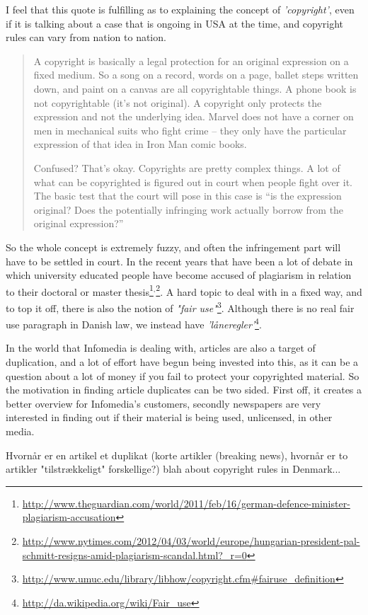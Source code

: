 I feel that this quote is fulfilling as to explaining the concept of \textit{'copyright'}, even if it is talking about a case that is ongoing in USA at the time, and copyright rules can vary from nation to nation.
\begin{quote}
A copyright is basically a legal protection for an original expression on a fixed medium. So a song on a record, words on a page, ballet steps written down, and paint on a canvas are all copyrightable things. A phone book is not copyrightable (it’s not original). A copyright only protects the expression and not the underlying idea. Marvel does not have a corner on men in mechanical suits who fight crime – they only have the particular expression of that idea in Iron Man comic books.

Confused? That's okay. Copyrights are pretty complex things. A lot of what can be copyrighted is figured out in court when people fight over it. The basic test that the court will pose in this case is “is the expression original? Does the potentially infringing work actually borrow from the original expression?” ~\cite{Copyright}
\end{quote}

So the whole concept is extremely fuzzy, and often the infringement part will have to be settled in court. In the recent years that have been a lot of debate in which university educated people have become accused of plagiarism  in relation to their doctoral or master thesis\footnote{\url{http://www.theguardian.com/world/2011/feb/16/german-defence-minister-plagiarism-accusation}}$^{,}$\footnote{\url{http://www.nytimes.com/2012/04/03/world/europe/hungarian-president-pal-schmitt-resigns-amid-plagiarism-scandal.html?_r=0}}. A hard topic to deal with in a fixed way, and to top it off, there is also the notion of \textit{"fair use"}\footnote{\url{http://www.umuc.edu/library/libhow/copyright.cfm\#fairuse_definition}}. Although there is no real fair use paragraph in Danish law, we instead have \textit{'låneregler'}\footnote{\url{http://da.wikipedia.org/wiki/Fair_use}}. 

In the world that Infomedia is dealing with, articles are also a target of duplication, and a lot of effort have begun being invested into this, as it can be a question about a lot of money if you fail to protect your copyrighted material. So the motivation in finding article duplicates can be two sided. First off, it creates a better overview for Infomedia's customers, secondly newspapers are very interested in finding out if their material is being used, unlicensed, in other media.




Hvornår er en artikel et duplikat (korte artikler (breaking news), hvornår er to artikler "tilstrækkeligt" forskellige?)
blah about copyright rules in Denmark...